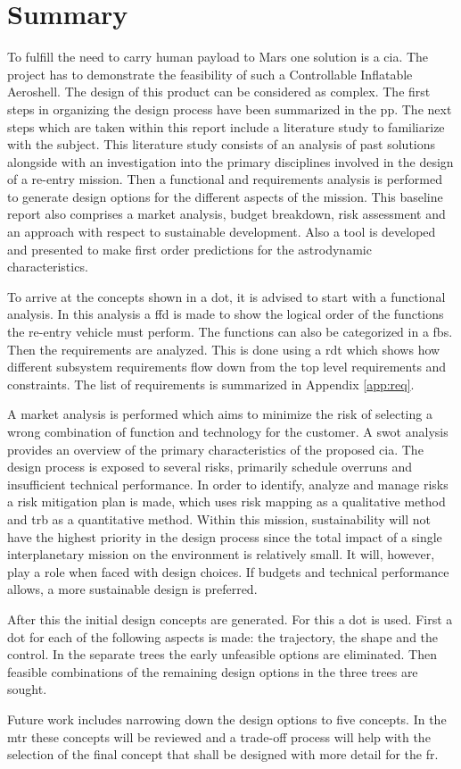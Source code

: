 \section*{Summary}\label{cha:summary}

To fulfill the need to carry human payload to Mars one solution is a \acrfull{cia}. The project has to demonstrate the feasibility of such a Controllable Inflatable Aeroshell. The design of this product can be considered as complex. The first steps in organizing the design process have been summarized in the \acrfull{pp}. The next steps which are taken within this report include a literature study to familiarize with the subject. This literature study consists of an analysis of past solutions alongside with an investigation into the primary disciplines involved in the design of a re-entry mission. Then a functional and requirements analysis is performed to generate design options for the different aspects of the mission. This baseline report also comprises a market analysis, budget breakdown, risk assessment and an approach with respect to sustainable development. Also a tool is developed and presented to make first order predictions for the astrodynamic characteristics. 

To arrive at the concepts shown in a \acrfull{dot}, it is advised to start with a functional analysis. In this analysis a \acrfull{ffd} is made to show the logical order of the functions the re-entry vehicle must perform. The functions can also be categorized in a \acrfull{fbs}. Then the requirements are analyzed. This is done using a \gls{rdt} which shows how different subsystem requirements flow down from the top level requirements and constraints. The list of requirements is summarized in Appendix \ref{app:req}.

A market analysis is performed which aims to minimize the risk of selecting a wrong combination of function and technology for the customer. A \acrfull{swot} analysis provides an overview of the primary characteristics of the proposed \gls{cia}. The design process is exposed to several risks, primarily schedule overruns and insufficient technical performance. In order to identify, analyze and manage risks a risk mitigation plan is made, which uses risk mapping as a qualitative method and \gls{trb} as a quantitative method. Within this mission, sustainability will not have the highest priority in the design process since the total impact of a single interplanetary mission on the environment is relatively small. It will, however, play a role when faced with design choices. If budgets and technical performance allows, a more sustainable design is preferred.

After this the initial design concepts are generated. For this a \gls{dot} is used. First a \gls{dot} for each of the following aspects is made: the trajectory, the shape and the control. In the separate trees the early unfeasible options are eliminated. Then feasible combinations of the remaining design options in the three trees are sought.

Future work includes narrowing down the design options to five concepts. In the \acrfull{mtr} these concepts will be reviewed and a trade-off process will help with the selection of the final concept that shall be designed with more detail for the \acrfull{fr}.
